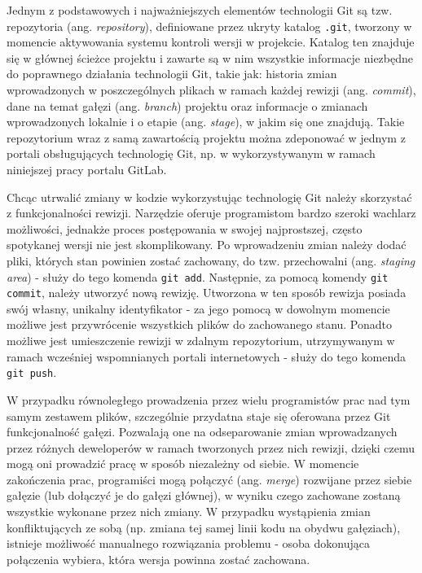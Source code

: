 Jednym z podstawowych i najważniejszych elementów technologii Git są tzw. repozytoria (ang. \emph{repository}), definiowane przez ukryty katalog \lstinline{.git}, tworzony w momencie aktywowania systemu kontroli wersji w projekcie. Katalog ten znajduje się w głównej ścieżce projektu i zawarte są w nim wszystkie informacje niezbędne do poprawnego działania technologii Git, takie jak: historia zmian wprowadzonych w poszczególnych plikach w ramach każdej rewizji (ang. \emph{commit}), dane na temat gałęzi (ang. \emph{branch}) projektu oraz informacje o zmianach wprowadzonych lokalnie i o etapie (ang. \emph{stage}), w jakim się one znajdują. Takie repozytorium wraz z samą zawartością projektu można zdeponować w jednym z portali obsługujących technologię Git, np. w wykorzystywanym w ramach niniejszej pracy portalu GitLab. 

Chcąc utrwalić zmiany w kodzie wykorzystując technologię Git należy skorzystać z funkcjonalności rewizji. Narzędzie oferuje programistom bardzo szeroki wachlarz możliwości, jednakże proces postępowania w swojej najprostszej, często spotykanej wersji nie jest skomplikowany. Po wprowadzeniu zmian należy dodać pliki, których stan powinien zostać zachowany, do tzw. przechowalni (ang. \emph{staging area}) - służy do tego komenda \lstinline{git add}. Następnie, za pomocą komendy \lstinline{git commit}, należy utworzyć nową rewizję. Utworzona w ten sposób rewizja posiada swój własny, unikalny identyfikator - za jego pomocą w dowolnym momencie możliwe jest przywrócenie wszystkich plików do zachowanego stanu. Ponadto możliwe jest umieszczenie rewizji w zdalnym repozytorium, utrzymywanym w ramach wcześniej wspomnianych portali internetowych - służy do tego komenda \lstinline{git push}.

W przypadku równoległego prowadzenia przez wielu programistów prac nad tym samym zestawem plików, szczególnie przydatna staje się oferowana przez Git funkcjonalność gałęzi. Pozwalają one na odseparowanie zmian wprowadzanych przez różnych deweloperów w ramach tworzonych przez nich rewizji, dzięki czemu mogą oni prowadzić pracę w sposób niezależny od siebie. W momencie zakończenia prac, programiści mogą połączyć (ang. \emph{merge}) rozwijane przez siebie gałęzie (lub dołączyć je do gałęzi głównej), w wyniku czego zachowane zostaną wszystkie wykonane przez nich zmiany. W przypadku wystąpienia zmian konfliktujących ze sobą (np. zmiana tej samej linii kodu na obydwu gałęziach), istnieje możliwość manualnego rozwiązania problemu - osoba dokonująca połączenia wybiera, która wersja powinna zostać zachowana.

